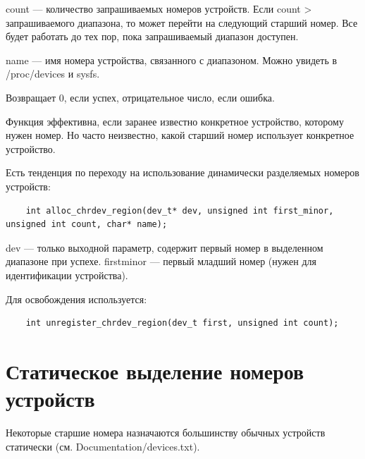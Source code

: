 count --- количество запрашиваемых номеров устройств. Если count > запрашиваемого диапазона, то может перейти на следующий старший номер. Все будет работать до тех пор, пока запрашиваемый диапазон доступен. 

name --- имя номера устройства, связанного с диапазоном. Можно увидеть в /proc/devices и sysfs.

Возвращает 0, если успех, отрицательное число, если ошибка. 

Функция эффективна, если заранее известно конкретное устройство, которому нужен номер. Но часто неизвестно, какой старший номер использует конкретное устройство.

Есть тенденция по переходу на использование динамически разделяемых номеров устройств:

\begin{lstlisting}
	int alloc_chrdev_region(dev_t* dev, unsigned int first_minor, unsigned int count, char* name);
\end{lstlisting}

dev --- только выходной параметр, содержит первый номер в выделенном диапазоне при успехе. firstminor --- первый младший номер (нужен для идентификации устройства).

Для освобождения используется:

\begin{lstlisting}
	int unregister_chrdev_region(dev_t first, unsigned int count);
\end{lstlisting}

\section{Статическое выделение номеров устройств}
Некоторые старшие номера назначаются большинству обычных устройств статически (см. Documentation/devices.txt). 

